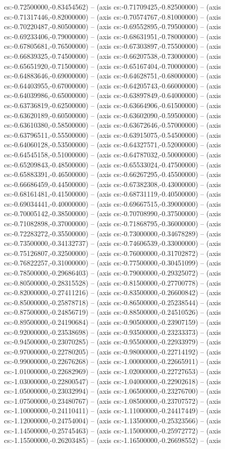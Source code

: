 cs:-0.72500000,-0.83454562) -- (axis cs:-0.71709425,-0.82500000) -- (axis cs:-0.71317446,-0.82000000) -- (axis cs:-0.70574767,-0.81000000) -- (axis cs:-0.70220487,-0.80500000) -- (axis cs:-0.69552895,-0.79500000) -- (axis cs:-0.69233406,-0.79000000) -- (axis cs:-0.68631951,-0.78000000) -- (axis cs:-0.67805681,-0.76500000) -- (axis cs:-0.67303897,-0.75500000) -- (axis cs:-0.66839325,-0.74500000) -- (axis cs:-0.66207538,-0.73000000) -- (axis cs:-0.65651920,-0.71500000) -- (axis cs:-0.65167404,-0.70000000) -- (axis cs:-0.64883646,-0.69000000) -- (axis cs:-0.64628751,-0.68000000) -- (axis cs:-0.64403955,-0.67000000) -- (axis cs:-0.64205743,-0.66000000) -- (axis cs:-0.64039986,-0.65000000) -- (axis cs:-0.63897849,-0.64000000) -- (axis cs:-0.63736819,-0.62500000) -- (axis cs:-0.63664906,-0.61500000) -- (axis cs:-0.63620189,-0.60500000) -- (axis cs:-0.63602090,-0.59500000) -- (axis cs:-0.63610380,-0.58500000) -- (axis cs:-0.63672646,-0.57000000) -- (axis cs:-0.63796511,-0.55500000) -- (axis cs:-0.63915075,-0.54500000) -- (axis cs:-0.64060128,-0.53500000) -- (axis cs:-0.64327571,-0.52000000) -- (axis cs:-0.64545158,-0.51000000) -- (axis cs:-0.64787032,-0.50000000) -- (axis cs:-0.65209843,-0.48500000) -- (axis cs:-0.65533024,-0.47500000) -- (axis cs:-0.65883391,-0.46500000) -- (axis cs:-0.66267295,-0.45500000) -- (axis cs:-0.66686459,-0.44500000) -- (axis cs:-0.67382308,-0.43000000) -- (axis cs:-0.68161481,-0.41500000) -- (axis cs:-0.68731119,-0.40500000) -- (axis cs:-0.69034441,-0.40000000) -- (axis cs:-0.69667515,-0.39000000) -- (axis cs:-0.70005142,-0.38500000) -- (axis cs:-0.70708990,-0.37500000) -- (axis cs:-0.71082898,-0.37000000) -- (axis cs:-0.71868795,-0.36000000) -- (axis cs:-0.72283272,-0.35500000) -- (axis cs:-0.73000000,-0.34678289) -- (axis cs:-0.73500000,-0.34132737) -- (axis cs:-0.74606539,-0.33000000) -- (axis cs:-0.75126807,-0.32500000) -- (axis cs:-0.76000000,-0.31702872) -- (axis cs:-0.76822257,-0.31000000) -- (axis cs:-0.77500000,-0.30451099) -- (axis cs:-0.78500000,-0.29686403) -- (axis cs:-0.79000000,-0.29325072) -- (axis cs:-0.80500000,-0.28315528) -- (axis cs:-0.81500000,-0.27700778) -- (axis cs:-0.82000000,-0.27411216) -- (axis cs:-0.83500000,-0.26600842) -- (axis cs:-0.85000000,-0.25878718) -- (axis cs:-0.86500000,-0.25238544) -- (axis cs:-0.87500000,-0.24856719) -- (axis cs:-0.88500000,-0.24510526) -- (axis cs:-0.89500000,-0.24190684) -- (axis cs:-0.90500000,-0.23907159) -- (axis cs:-0.92000000,-0.23538698) -- (axis cs:-0.93500000,-0.23233373) -- (axis cs:-0.94500000,-0.23070285) -- (axis cs:-0.95500000,-0.22933979) -- (axis cs:-0.97000000,-0.22780205) -- (axis cs:-0.98000000,-0.22714192) -- (axis cs:-0.99000000,-0.22676268) -- (axis cs:-1.00000000,-0.22665911) -- (axis cs:-1.01000000,-0.22682969) -- (axis cs:-1.02000000,-0.22727653) -- (axis cs:-1.03000000,-0.22800547) -- (axis cs:-1.04000000,-0.22902618) -- (axis cs:-1.05000000,-0.23032994) -- (axis cs:-1.06500000,-0.23276700) -- (axis cs:-1.07500000,-0.23480767) -- (axis cs:-1.08500000,-0.23707572) -- (axis cs:-1.10000000,-0.24110411) -- (axis cs:-1.11000000,-0.24417449) -- (axis cs:-1.12000000,-0.24754004) -- (axis cs:-1.13500000,-0.25323566) -- (axis cs:-1.14500000,-0.25745463) -- (axis cs:-1.15000000,-0.25972772) -- (axis cs:-1.15500000,-0.26203485) -- (axis cs:-1.16500000,-0.26698552) -- (axis 